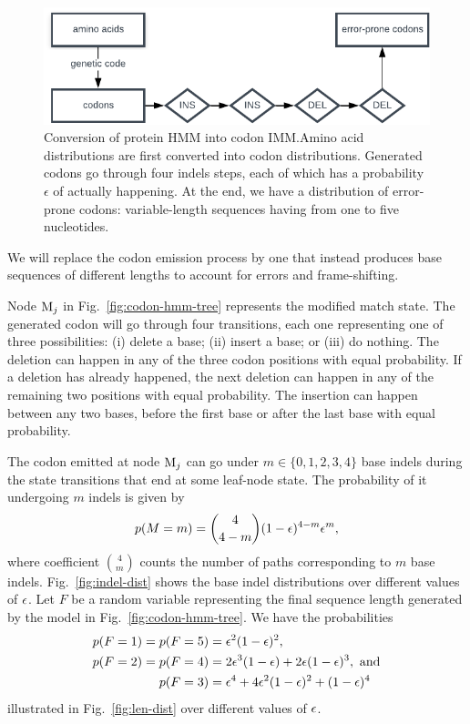 \begin{figure}[htbp]
  \centering
  \captionsetup{width=.6\linewidth}
  \includegraphics[width=.6\linewidth]{figure/hmm-to-imm}
  \caption{Conversion of protein HMM into codon IMM.\@ Amino acid distributions are first converted
  into codon distributions. Generated codons go through four indels steps, each of which has a
  probability $\epsilon$ of actually happening. At the end, we have a distribution of error-prone
  codons: variable-length sequences having from one to five nucleotides.}\label{fig:hmm-to-imm}
\end{figure}

We will replace the codon emission process by one
that instead produces base sequences of different lengths to account for errors and frame-shifting.

Node $\mathrm{M}_j$ in Fig.~\ref{fig:codon-hmm-tree} represents the modified match state.
The generated codon will go through four transitions, each one representing one of three possibilities: (i) delete a base; (ii) insert a base; or (iii) do nothing.
The deletion can happen in any of the three codon positions with equal probability.
If a deletion has already happened, the next deletion can happen in any of the remaining two positions with equal probability.
The insertion can happen between any two bases, before the first base or after the last base with equal probability.

The codon emitted at node $\mathrm{M}_j$ can go under $m\in\{0, 1, 2, 3, 4\}$ base indels during
the state transitions that end at some leaf-node state.
The probability of it undergoing $m$ indels is given by
\begin{equation*}
  p(M=m) = \binom{4}{4-m} (1 - \epsilon)^{4-m} \epsilon^m,
\end{equation*}
where coefficient $\binom{4}{m}$ counts the number of paths corresponding to $m$ base indels.
Fig.~\ref{fig:indel-dist} shows the base indel distributions over different values of $\epsilon$.
Let $F$ be a random variable representing the final sequence length generated by the model in
Fig.~\ref{fig:codon-hmm-tree}.
We have the probabilities
\begin{equation*}
  \begin{split}
    p(F=1) = p(F=5) &= \epsilon^2(1-\epsilon)^2, \\
    p(F=2) = p(F=4) &= 2\epsilon^3(1-\epsilon) + 2\epsilon(1-\epsilon)^3,~\text{and} \\
    p(F=3)          &= \epsilon^4 + 4\epsilon^2(1-\epsilon)^2 + (1-\epsilon)^4
  \end{split}
\end{equation*}
illustrated in Fig.~\ref{fig:len-dist} over different values of $\epsilon$.

